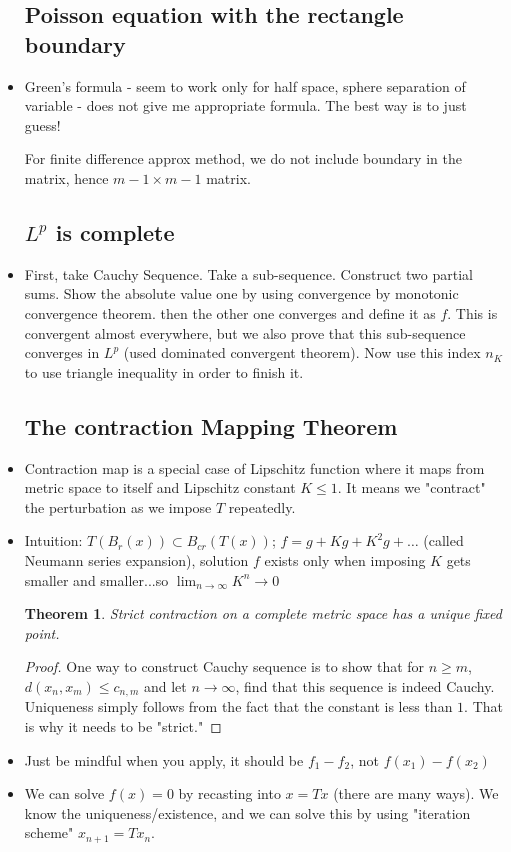 \documentclass{article}
\newtheorem{theorem}{Theorem}
\theoremstyle{remark}
\begin{document}
\begin{itemize}
    

\subsection*{Poisson equation with the rectangle boundary}
\item Green's formula - seem to work only for half space, sphere
separation of variable - does not give me appropriate formula. The best way is to just guess!

For finite difference approx method, we do not include boundary in the matrix, hence $m-1\times m-1$ matrix.

\subsection*{$L^p$ is complete}
\item First, take Cauchy Sequence. Take a sub-sequence. Construct two partial sums. Show the absolute value one by using convergence by monotonic convergence theorem. then the other one converges and define it as $f$. This is convergent almost everywhere, but we also prove that this sub-sequence converges in $L^p$ (used dominated convergent theorem). Now use this index $n_K$ to use triangle inequality in order to finish it.






\subsection*{The contraction Mapping Theorem}

\item Contraction map is a special case of Lipschitz function where it maps from metric space to itself and Lipschitz constant $K\leq 1$. It means we "contract" the perturbation as we impose $T$ repeatedly. 
\item Intuition: $T(B_r (x))\subset B_{cr}(T(x))$; $f=g+Kg+K^2g+\dots$ (called Neumann series expansion), solution $f$ exists only when imposing $K$ gets smaller and smaller...so $\lim_{n\to\infty}K^n\to 0$

\begin{theorem}
Strict contraction on a complete metric space has a unique fixed point.
\end{theorem}
\begin{proof}
One way to construct Cauchy sequence is to show that for $n\geq m$, $d(x_n,x_m)\leq c_{n,m}$ and let $n\to\infty$, find that this sequence is indeed Cauchy. Uniqueness simply follows from the fact that the constant is less than $1$. That is why it needs to be "strict."
\end{proof}
\item Just be mindful when you apply, it should be $f_1-f_2$, not $f(x_1)-f(x_2)$
\item
We can solve $f(x)=0$ by recasting into $x=Tx$ (there are many ways). We know the uniqueness/existence, and we can solve this by using "iteration scheme" $x_{n+1}=Tx_n$.


\end{itemize}
\end{document}
